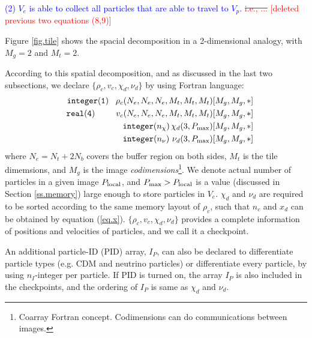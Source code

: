 \documentclass[10pt,twocolumn,preprint]{emulateapj}
\newcommand{\bs}{\boldsymbol}
\newcommand{\tcb}{\textcolor{blue}}
\newcommand{\tcr}{\textcolor{red}}
\begin{document}
\tcb{(2) $V_e$ is able to collect all particles that are able to travel to $V_p$.} \tcr{\sout{i.e., ... }[deleted previous two equations (8,9)]}

Figure \ref{fig.tile} shows the spacial decomposition in a 2-dimensional analogy, with $M_g=2$ and $M_t=2$.

According to this spatial decomposition, and as discussed in the last two subsections, we declare $\{\rho_c,v_c,\chi_d,\nu_d\}$ by using Fortran language:
\begin{eqnarray*}
	&&{\tt integer(1)}\ \ \, \rho_c(N_e,N_e,N_e,M_t,M_t,M_t)[M_g,M_g,*]\\
	&&{\tt real(4)}\ \ \ \ \ \ \ \, v_c(N_e,N_e,N_e,M_t,M_t,M_t)[M_g,M_g,*]\\
	&&{\tt integer(}n_\chi{\tt )}\, \chi_d(3,P_{\rm max})[M_g,M_g,*]\\
	&&{\tt integer(}n_\nu{\tt )}\ \nu_d(3,P_{\rm max})[M_g,M_g,*]
\end{eqnarray*}
where $N_e=N_t+2N_b$ covers the buffer region on both sides, $M_t$ is the tile dimemsions, and $M_g$ is the image {\it codimensions}\footnote{Coarray Fortran concept. Codimensions can do communications between images.}. We denote actual number of particles in a given image $P_{\rm local}$, and $P_{\rm max}>P_{\rm local}$ is a value (discussed in Section \ref{ss.memory}) large enough to store particles in $V_e$. $\chi_d$ and $\nu_d$
are required to be sorted according to the same memory layout of $\rho_c$, such that $n_c$ and $x_d$ can be obtained by equation (\ref{eq.x}).
$\{\rho_c,v_c,\chi_d,\nu_d\}$ provides a complete information of positions and velocities of particles, and we call it a checkpoint.

An additional particle-ID (PID) array, $I_P$, can also be declared to differentiate particle types (e.g. CDM and neutrino particles) or differentiate every particle, by using $n_I$-integer per particle. If PID is turned on, the array $I_P$ is also included in the checkpoints, and the ordering of $I_P$ is same as $\chi_d$ and $\nu_d$.
\end{document}
